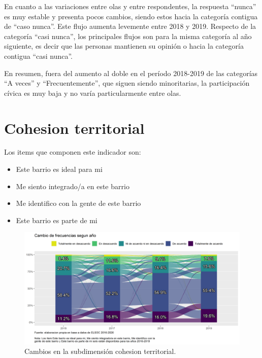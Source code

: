 \documentclass[
  12pt,
]{book}
\begin{document}
En cuanto a las variaciones entre olas y entre respondentes, la respuesta ``nunca'' es muy estable y presenta pocos cambios, siendo estos hacia la categoría contigua de ``caso nunca''. Este flujo aumenta levemente entre 2018 y 2019. Respecto de la categoría ``casi nunca'', los principales flujos son para la misma categoría al año siguiente, es decir que las personas mantienen su opinión o hacia la categoría contigua ``casi nunca''.

En resumen, fuera del aumento al doble en el período 2018-2019 de las categorías ``A veces'' y ``Frecuentemente'', que siguen siendo minoritarias, la participación cívica es muy baja y no varía particularmente entre olas.

\hypertarget{cohesion-territorial}{%
\section{Cohesion territorial}\label{cohesion-territorial}}

Los items que componen este indicador son:

\begin{itemize}
\item
  Este barrio es ideal para mi
\item
  Me siento integrado/a en este barrio
\item
  Me identifico con la gente de este barrio
\item
  Este barrio es parte de mi
\end{itemize}

\begin{figure}[H]

{\centering \includegraphics[width=1\linewidth,height=1\textheight]{output/graphs/alluvial_cohesion_territorial} 

}

\caption{Cambios en la subdimensión cohesion territorial.}\label{fig:alluvial-cohesion-territorial}
\end{figure}
\end{document}
